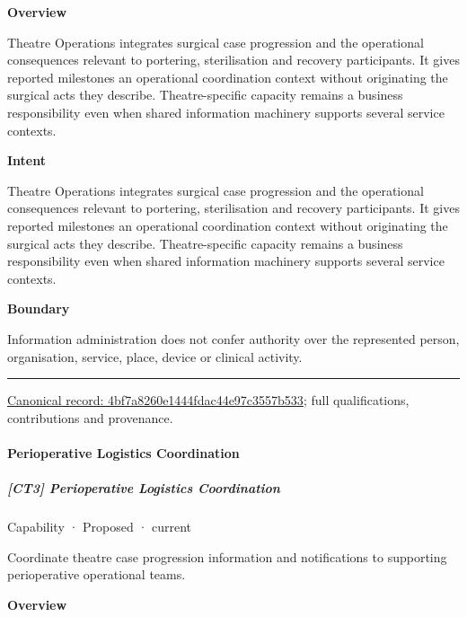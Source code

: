 \textbf{Overview}



Theatre Operations integrates surgical case progression and the operational consequences relevant to portering, sterilisation and recovery participants. It gives reported milestones an operational coordination context without originating the surgical acts they describe. Theatre-specific capacity remains a business responsibility even when shared information machinery supports several service contexts.



\textbf{Intent}



Theatre Operations integrates surgical case progression and the operational consequences relevant to portering, sterilisation and recovery participants. It gives reported milestones an operational coordination context without originating the surgical acts they describe. Theatre-specific capacity remains a business responsibility even when shared information machinery supports several service contexts.



\textbf{Boundary}



Information administration does not confer authority over the represented person, organisation, service, place, device or clinical activity.



\medskip\hrule\medskip

{\footnotesize \href{../../../../continuum/strategy/capability/4bf7a8260e1444fdac44e97c3557b533.md}{Canonical record: 4bf7a8260e1444fdac44e97c3557b533}; full qualifications, contributions and provenance.}\par
\paragraph{Perioperative Logistics Coordination}

\subparagraph{[CT3] Perioperative Logistics Coordination}

\label{element:6b7c08b60b5b48519bfe4b6f993dd6fb}
{\small Capability · Proposed · current}\par

Coordinate theatre case progression information and notifications to supporting perioperative operational teams.



\textbf{Overview}




